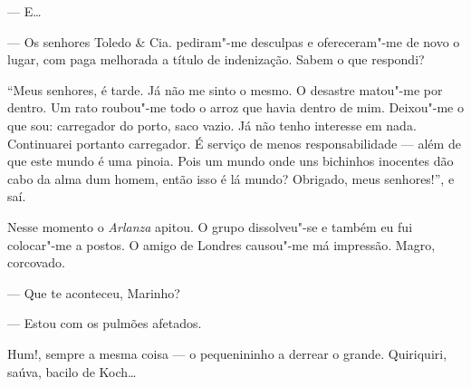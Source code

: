 --- E\ldots{}

--- Os senhores Toledo \& Cia. pediram"-me desculpas e ofereceram"-me de
novo o lugar, com paga melhorada a título de indenização. Sabem o que
respondi?

``Meus senhores, é tarde. Já não me sinto o mesmo. O desastre matou"-me
por dentro. Um rato roubou"-me todo o arroz que havia dentro de mim.
Deixou"-me o que sou: carregador do porto, saco vazio. Já não tenho
interesse em nada. Continuarei portanto carregador. É serviço de menos
responsabilidade --- além de que este mundo é uma pinoia. Pois um mundo
onde uns bichinhos inocentes dão cabo da alma dum homem, então isso é lá
mundo? Obrigado, meus senhores!'', e saí.

Nesse momento o \emph{Arlanza} apitou. O grupo dissolveu"-se e também eu
fui colocar"-me a postos. O amigo de Londres causou"-me má impressão.
Magro, corcovado.

--- Que te aconteceu, Marinho?

--- Estou com os pulmões afetados.

Hum!, sempre a mesma coisa --- o pequenininho a derrear o grande.
Quiriquiri, saúva, bacilo de Koch\ldots{}


